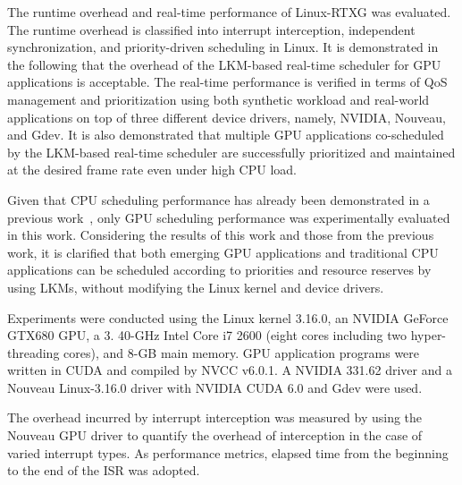 \label{sec:evaluation}
The runtime overhead and real-time performance of Linux-RTXG was evaluated.
The runtime overhead is classified into interrupt interception, independent synchronization, and priority-driven scheduling in Linux.
It is demonstrated in the following that the overhead of the LKM-based real-time scheduler for GPU applications is acceptable.
The real-time performance is verified in terms of QoS management and prioritization using both synthetic workload and real-world applications on top of three different device drivers, namely, NVIDIA, Nouveau, and Gdev.
It is also demonstrated that multiple GPU applications co-scheduled by the LKM-based real-time scheduler are successfully prioritized and maintained at the desired frame rate even under high CPU load.

Given that CPU scheduling performance has already been demonstrated in a previous work~\cite{kato2009loadable}, only GPU scheduling performance was experimentally evaluated in this work.
Considering the results of this work and those from the previous work, it is clarified that both emerging GPU applications and traditional CPU applications can be scheduled according to priorities and resource reserves by using LKMs, without modifying the Linux kernel and device drivers.

Experiments were conducted using the Linux kernel 3.16.0, an NVIDIA GeForce GTX680 GPU, a 3.
40-GHz Intel Core i7 2600 (eight cores including two hyper-threading cores), and 8-GB main memory.
GPU application programs were written in CUDA and compiled by NVCC v6.0.1. A NVIDIA 331.62 driver and a Nouveau Linux-3.16.0 driver with NVIDIA CUDA 6.0 and Gdev were used.

The overhead incurred by interrupt interception was measured by using the Nouveau GPU driver to quantify the overhead of interception in the case of varied interrupt types.
As performance metrics, elapsed time from the beginning to the end of the ISR was adopted.



